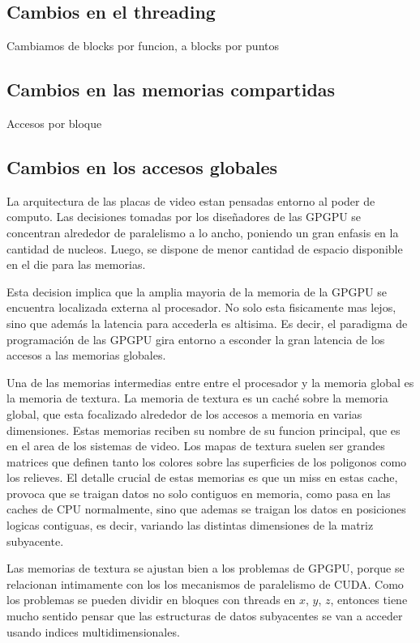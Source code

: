 \subsection{Cambios en el threading}
Cambiamos de blocks por funcion, a blocks por puntos

\subsection{Cambios en las memorias compartidas}
Accesos por bloque

\subsection{Cambios en los accesos globales}
La arquitectura de las placas de video estan pensadas entorno al poder de computo.
Las decisiones tomadas por los diseñadores de las GPGPU se concentran alrededor
de paralelismo a lo ancho, poniendo un gran enfasis en la cantidad de nucleos. Luego,
se dispone de menor cantidad de espacio disponible en el die para las memorias. 

Esta decision implica que la amplia mayoria de la memoria de la GPGPU se encuentra
localizada externa al procesador.  No solo esta fisicamente mas lejos, sino que
adem\'as la latencia para accederla es altisima. Es decir, el paradigma de
programaci\'on de las GPGPU gira entorno a esconder la gran latencia de los accesos
a las memorias globales.

Una de las memorias intermedias entre entre el procesador y la memoria global es
la memoria de textura. La memoria de textura es un cach\'e sobre la memoria global, 
que esta focalizado alrededor de los accesos a memoria en varias dimensiones.
Estas memorias reciben su nombre de su funcion principal, que es en el area de los
sistemas de video. Los mapas de textura suelen ser grandes matrices que definen
tanto los colores sobre las superficies de los poligonos como los relieves.
El detalle crucial de estas memorias es que un miss en estas cache, provoca
que se traigan datos no solo contiguos en memoria, como pasa en las caches de 
CPU normalmente, sino que ademas se traigan los datos en posiciones logicas contiguas,
es decir, variando las distintas dimensiones de la matriz subyacente. 

Las memorias de textura se ajustan bien a los problemas de GPGPU, porque se relacionan
intimamente con los los mecanismos de paralelismo de CUDA. Como los problemas se pueden
dividir en bloques con threads en $x$, $y$, $z$, entonces tiene mucho sentido pensar
que las estructuras de datos subyacentes se van a acceder usando indices multidimensionales.


